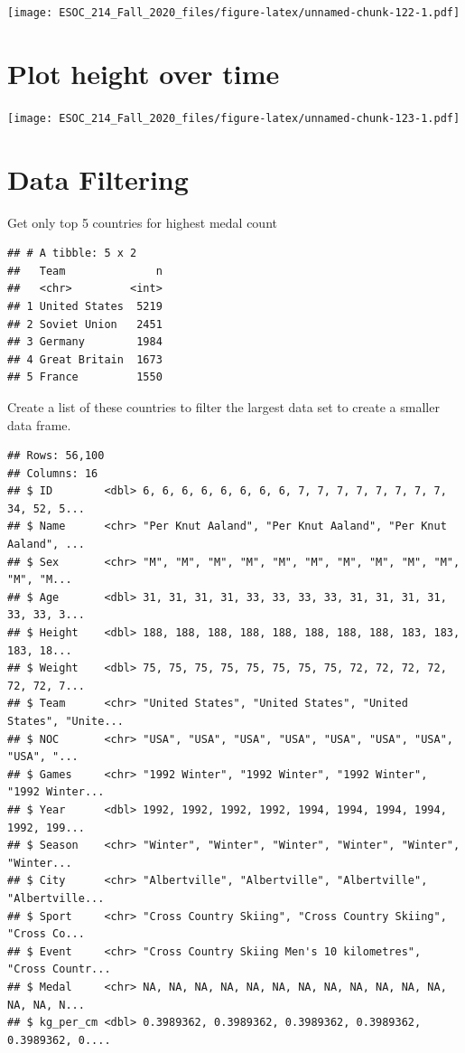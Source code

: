 \documentclass[
]{book}
\begin{document}
\texttt{[image: ESOC\_214\_Fall\_2020\_files/figure-latex/unnamed-chunk-122-1.pdf]}

\hypertarget{plot-height-over-time}{%
\section{Plot height over time}\label{plot-height-over-time}}

\texttt{[image: ESOC\_214\_Fall\_2020\_files/figure-latex/unnamed-chunk-123-1.pdf]}

\hypertarget{data-filtering}{%
\section{Data Filtering}\label{data-filtering}}

Get only top 5 countries for highest medal count

\begin{verbatim}
## # A tibble: 5 x 2
##   Team              n
##   <chr>         <int>
## 1 United States  5219
## 2 Soviet Union   2451
## 3 Germany        1984
## 4 Great Britain  1673
## 5 France         1550
\end{verbatim}

Create a list of these countries to filter the largest data set to create a smaller data frame.

\begin{verbatim}
## Rows: 56,100
## Columns: 16
## $ ID        <dbl> 6, 6, 6, 6, 6, 6, 6, 6, 7, 7, 7, 7, 7, 7, 7, 7, 34, 52, 5...
## $ Name      <chr> "Per Knut Aaland", "Per Knut Aaland", "Per Knut Aaland", ...
## $ Sex       <chr> "M", "M", "M", "M", "M", "M", "M", "M", "M", "M", "M", "M...
## $ Age       <dbl> 31, 31, 31, 31, 33, 33, 33, 33, 31, 31, 31, 31, 33, 33, 3...
## $ Height    <dbl> 188, 188, 188, 188, 188, 188, 188, 188, 183, 183, 183, 18...
## $ Weight    <dbl> 75, 75, 75, 75, 75, 75, 75, 75, 72, 72, 72, 72, 72, 72, 7...
## $ Team      <chr> "United States", "United States", "United States", "Unite...
## $ NOC       <chr> "USA", "USA", "USA", "USA", "USA", "USA", "USA", "USA", "...
## $ Games     <chr> "1992 Winter", "1992 Winter", "1992 Winter", "1992 Winter...
## $ Year      <dbl> 1992, 1992, 1992, 1992, 1994, 1994, 1994, 1994, 1992, 199...
## $ Season    <chr> "Winter", "Winter", "Winter", "Winter", "Winter", "Winter...
## $ City      <chr> "Albertville", "Albertville", "Albertville", "Albertville...
## $ Sport     <chr> "Cross Country Skiing", "Cross Country Skiing", "Cross Co...
## $ Event     <chr> "Cross Country Skiing Men's 10 kilometres", "Cross Countr...
## $ Medal     <chr> NA, NA, NA, NA, NA, NA, NA, NA, NA, NA, NA, NA, NA, NA, N...
## $ kg_per_cm <dbl> 0.3989362, 0.3989362, 0.3989362, 0.3989362, 0.3989362, 0....
\end{verbatim}
\end{document}
